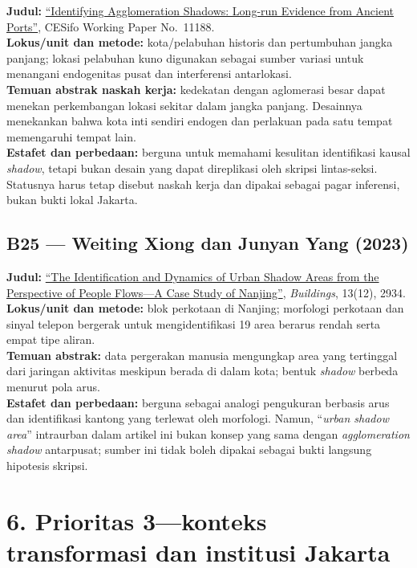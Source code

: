 \documentclass[
  indonesian,
  11pt,
  a4paper,
  oneside,
  openany]{report}
\begin{document}
\textbf{Judul:}
\href{https://doi.org/10.2139/ssrn.4889236}{``Identifying Agglomeration
Shadows: Long-run Evidence from Ancient Ports''}, CESifo Working Paper
No.~11188.\\
\textbf{Lokus/unit dan metode:} kota/pelabuhan historis dan pertumbuhan
jangka panjang; lokasi pelabuhan kuno digunakan sebagai sumber variasi
untuk menangani endogenitas pusat dan interferensi antarlokasi.\\
\textbf{Temuan abstrak naskah kerja:} kedekatan dengan aglomerasi besar
dapat menekan perkembangan lokasi sekitar dalam jangka panjang.
Desainnya menekankan bahwa kota inti sendiri endogen dan perlakuan pada
satu tempat memengaruhi tempat lain.\\
\textbf{Estafet dan perbedaan:} berguna untuk memahami kesulitan
identifikasi kausal \emph{shadow}, tetapi bukan desain yang dapat
direplikasi oleh skripsi lintas-seksi. Statusnya harus tetap disebut
naskah kerja dan dipakai sebagai pagar inferensi, bukan bukti lokal
Jakarta.

\subsection{B25 --- Weiting Xiong dan Junyan Yang
(2023)}\label{b25-weiting-xiong-dan-junyan-yang-2023}

\textbf{Judul:} \href{https://doi.org/10.3390/buildings13122934}{``The
Identification and Dynamics of Urban Shadow Areas from the Perspective
of People Flows---A Case Study of Nanjing''}, \emph{Buildings}, 13(12),
2934.\\
\textbf{Lokus/unit dan metode:} blok perkotaan di Nanjing; morfologi
perkotaan dan sinyal telepon bergerak untuk mengidentifikasi 19 area
berarus rendah serta empat tipe aliran.\\
\textbf{Temuan abstrak:} data pergerakan manusia mengungkap area yang
tertinggal dari jaringan aktivitas meskipun berada di dalam kota; bentuk
\emph{shadow} berbeda menurut pola arus.\\
\textbf{Estafet dan perbedaan:} berguna sebagai analogi pengukuran
berbasis arus dan identifikasi kantong yang terlewat oleh morfologi.
Namun, ``\emph{urban shadow area}'' intraurban dalam artikel ini bukan
konsep yang sama dengan \emph{agglomeration shadow} antarpusat; sumber
ini tidak boleh dipakai sebagai bukti langsung hipotesis skripsi.

\section{6. Prioritas 3---konteks transformasi dan institusi
Jakarta}\label{prioritas-3konteks-transformasi-dan-institusi-jakarta}
\end{document}
